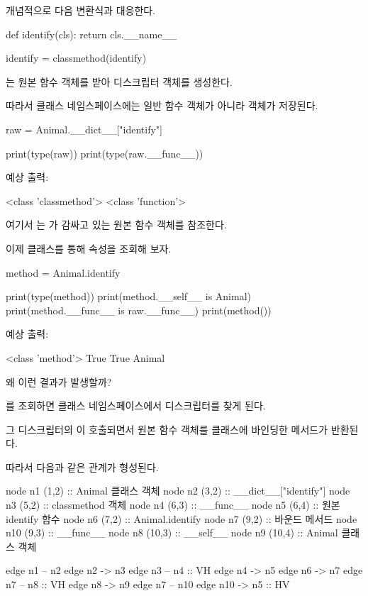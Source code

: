 개념적으로 다음 변환식과 대응한다.

\begin{dhkcode}
def identify(cls):
    return cls.__name__

identify = classmethod(identify)
\end{dhkcode}

는 원본 함수 객체를 받아 디스크립터 객체를 생성한다.

따라서 클래스 네임스페이스에는 일반 함수 객체가 아니라  객체가 저장된다.

\begin{dhkcode}
raw = Animal.__dict__["identify"]

print(type(raw))
print(type(raw.__func__))
\end{dhkcode}

예상 출력:

\begin{dhkzsh}
<class 'classmethod'>
<class 'function'>
\end{dhkzsh}

여기서 는 가 감싸고 있는 원본 함수 객체를 참조한다.

이제 클래스를 통해 속성을 조회해 보자.

\begin{dhkcode}
method = Animal.identify

print(type(method))
print(method.__self__ is Animal)
print(method.__func__ is raw.__func__)
print(method())
\end{dhkcode}

예상 출력:

\begin{dhkzsh}
<class 'method'>
True
True
Animal
\end{dhkzsh}

왜 이런 결과가 발생할까?

를 조회하면 클래스 네임스페이스에서  디스크립터를 찾게 된다.

그 디스크립터의 이 호출되면서 원본 함수 객체를  클래스에 바인딩한 메서드가 반환된다.

따라서 다음과 같은 관계가 형성된다.

\begin{dhkdiagram}[in=4]
node n1 (1,2) :: Animal 클래스 객체
node n2 (3,2) :: __dict__["identify"]
node n3 (5,2) :: classmethod 객체
node n4 (6,3) :: __func__
node n5 (6,4) :: 원본 identify 함수
node n6 (7,2) :: Animal.identify
node n7 (9,2) :: 바운드 메서드
node n10 (9,3) :: __func__
node n8 (10,3) :: __self__
node n9 (10,4) :: Animal 클래스 객체

edge n1 -- n2
edge n2 -> n3
edge n3 -- n4 :: VH
edge n4 -> n5
edge n6 -> n7
edge n7 -- n8 :: VH
edge n8 -> n9
edge n7 -- n10
edge n10 -> n5 :: HV
\end{dhkdiagram}

